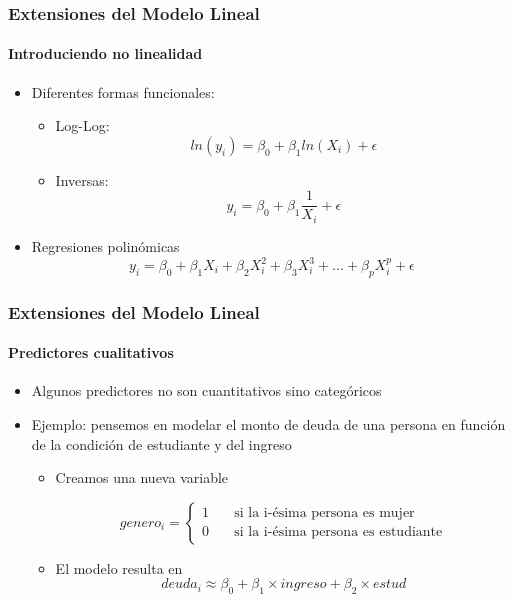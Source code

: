 \documentclass{beamer}
\begin{document}
\begin{frame}
	\frametitle{Extensiones del Modelo Lineal}
	\framesubtitle{Introduciendo no linealidad}
	\begin{itemize}
		\item{Diferentes formas funcionales}:
			\begin{itemize}
				\item{Log-Log:
				 		\begin{equation}
				 		ln{(y_{i})} = \beta_{0} + \beta_{1}ln{(X_{i})} + \epsilon
				 		\end{equation}}
				 \item{Inversas:
				 		\begin{equation}
				 		y_{i} = \beta_{0} + \beta_{1}\frac{1}{X_{i}} + \epsilon
				 		\end{equation}}
			\end{itemize}
		\item{Regresiones polinómicas}
		\begin{equation}
		y_{i} = \beta_{0} + \beta_{1}X_{i}+ \beta_{2}X_{i}^2 + \beta_{3}X_{i}^3 + ... + \beta_{p}X_{i}^p + \epsilon
		\end{equation}	
	\end{itemize}
\end{frame}


\begin{frame}
\frametitle{Extensiones del Modelo Lineal}
\framesubtitle{Predictores cualitativos}
\begin{itemize}
	\item{Algunos predictores no son cuantitativos sino categóricos}
	\item{Ejemplo: pensemos en modelar el monto de deuda de una persona en función de la condición de estudiante y del ingreso}
	\begin{itemize}
		\item{Creamos una nueva variable
			
			\[genero_{i} =
			\begin{cases}
			1       & \quad \text{si la i-ésima persona es mujer}\\
			0  & \quad \text{si la i-ésima persona es estudiante}
			\end{cases}
			\]
		}
		\item{El modelo resulta en}
		\[deuda_{i} \approx \beta_{0} + \beta_{1} \times ingreso + \beta_{2} \times estud
		\]
	\end{itemize}
\end{itemize}
\end{frame}
\end{document}
